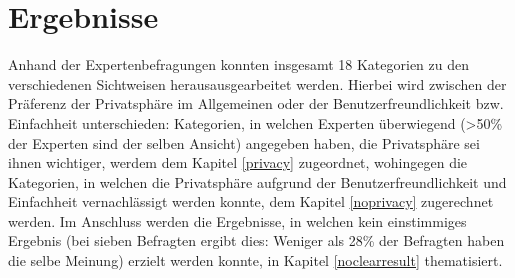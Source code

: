 \chapter{Ergebnisse} %
\label{Results} %

Anhand der Expertenbefragungen konnten insgesamt 18 Kategorien zu den verschiedenen Sichtweisen herausausgearbeitet werden. Hierbei wird zwischen
der Präferenz der Privatsphäre im Allgemeinen oder der Benutzerfreundlichkeit bzw. Einfachheit unterschieden: Kategorien, in welchen Experten überwiegend
(>50\% der Experten sind der selben Ansicht) angegeben haben, die Privatsphäre sei ihnen wichtiger, werdem dem Kapitel \ref{privacy} zugeordnet, wohingegen die Kategorien, in welchen die Privatsphäre
aufgrund der Benutzerfreundlichkeit und Einfachheit vernachlässigt werden konnte, dem Kapitel \ref{noprivacy} zugerechnet werden. Im Anschluss werden die Ergebnisse,
in welchen kein einstimmiges Ergebnis (bei sieben Befragten ergibt dies: Weniger als 28\% der Befragten haben die selbe Meinung) erzielt werden konnte, in Kapitel \ref{noclearresult} thematisiert.

